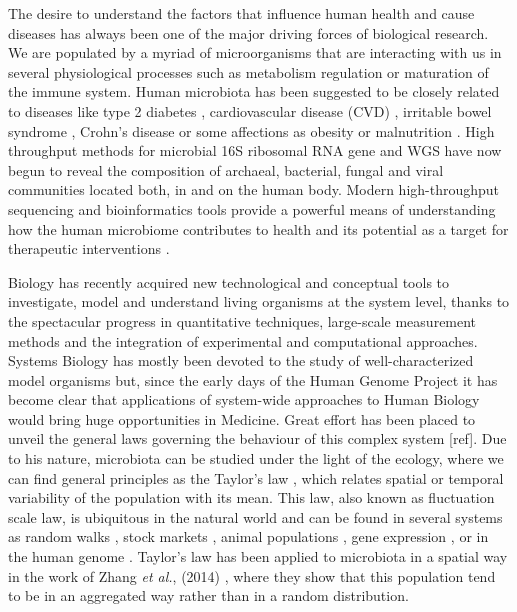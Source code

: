 The desire to understand the factors that influence human health and cause diseases has always been one of the major driving forces of biological research. We are populated by a myriad of microorganisms that are interacting with us in several physiological processes such as metabolism regulation or maturation of the immune system. Human microbiota has been suggested to be closely related to diseases like type 2 diabetes 
\cite{diabetes2}, cardiovascular disease (CVD) \cite{CVD}, irritable bowel syndrome \cite{IBS}, Crohn's disease \cite{CD} or some affections as obesity \cite{ob1, ob2} or malnutrition \cite{nutr}. High throughput methods for microbial 16S ribosomal RNA gene and WGS have now begun to reveal the composition of archaeal, bacterial, fungal and viral communities located both, in and on the human body. Modern high-throughput sequencing and bioinformatics tools provide a powerful means of understanding how the human microbiome contributes to health and its potential as a target for therapeutic interventions \cite{microb&health, sysbio&microb}. 

Biology has recently acquired new technological and conceptual tools to investigate, model and understand living organisms at the system level, thanks to the spectacular progress in quantitative techniques, large-scale measurement methods and the integration of experimental and computational approaches. Systems Biology has mostly been devoted to the study of well-characterized model organisms but, since the early days of the Human Genome Project \cite{humangenome} it has become clear that applications of system-wide approaches to Human Biology would bring huge opportunities in Medicine. Great effort has been placed to unveil the general laws governing the behaviour of this complex system [ref]. Due to his nature, microbiota can be studied under the light of the ecology, where we can find general principles as the Taylor's law \cite{taylor}, which relates spatial or temporal variability of the population with its mean. This law, also known as fluctuation scale law, is ubiquitous in the natural world and can be found in several systems as random walks \cite{randomwalks}, stock markets \cite{economics1, economics2}, animal populations \cite{taylor, animal1, animal2}, gene expression \cite{genexpress}, or in the human genome \cite{genome}. Taylor's law has been applied to microbiota in a spatial way in the work of Zhang {\it et al.}, (2014) \cite{isme1}, where they show that this population tend to be in an aggregated way rather than in a random distribution. 

